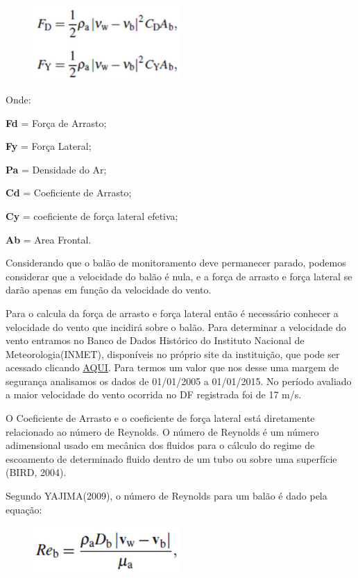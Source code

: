 	\begin{figure}[H]
		\centering
		\includegraphics[width=0.5\textwidth]{figuras/equacoesArrasto}
		\caption{}
		\label{img:equacoesArrasto}
	\end{figure}

	Onde:

	\textbf{Fd} = Força de Arrasto;

	\textbf{Fy} = Força Lateral;

	\textbf{Pa} = Densidade do Ar;

	\textbf{Cd} = Coeficiente de Arrasto;

	\textbf{Cy} = coeficiente de força lateral efetiva;

	\textbf{Ab} = Area Frontal.

	Considerando que o balão de monitoramento deve permanecer parado, podemos considerar que a velocidade do balão é nula, e a força de arrasto e força lateral se darão apenas em função da velocidade do vento.

	Para o calcula da força de arrasto e força lateral então é necessário conhecer a velocidade do vento que incidirá sobre o balão. Para determinar a velocidade do vento entramos no Banco de Dados Histórico do Instituto Nacional de Meteorologia(INMET), disponíveis no próprio site da instituição, que pode ser acessado clicando \href{www.inmet.gov.br}{AQUI}. Para termos um valor que nos desse uma margem de segurança analisamos os dados de 01/01/2005 a 01/01/2015. No período avaliado a maior velocidade do vento ocorrida no DF registrada foi de 17 m/s.

	O Coeficiente de Arrasto e o coeficiente de força lateral está diretamente relacionado ao número de Reynolds. O número de Reynolds é um número adimensional usado em mecânica dos fluidos para o cálculo do regime de escoamento de determinado fluido dentro de um tubo ou sobre uma superfície (BIRD, 2004).

	Segundo YAJIMA(2009), o número de Reynolds para um balão é dado pela equação:

	\begin{figure}[H]
		\centering
		\includegraphics[width=0.5\textwidth]{figuras/equacaoNumeroDeRey}
		\caption{}
		\label{img:equacaoNumeroDeRey}
	\end{figure}

